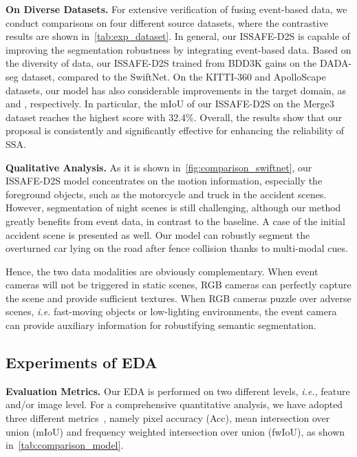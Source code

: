 \documentclass[letterpaper, 10 pt, conference]{ieeeconf}
\begin{document}
\textbf{On Diverse Datasets.}
For extensive verification of fusing event-based data, we conduct comparisons on four different source datasets, where the contrastive results are shown in~\cref{tab:exp_dataset}.
In general, our ISSAFE-D2S is capable of improving the segmentation robustness by integrating event-based data.
Based on the diversity of data, our ISSAFE-D2S trained from BDD3K gains  on the DADA-seg dataset, compared to the SwiftNet.
On the KITTI-360 and ApolloScape datasets, our model has also considerable improvements in the target domain, as  and , respectively.
In particular, the mIoU of our ISSAFE-D2S on the Merge3 dataset reaches the highest score with 32.4\%.
Overall, the results show that our proposal is consistently and significantly effective for enhancing the reliability of SSA.


\textbf{Qualitative Analysis.} As it is shown in~\cref{fig:comparison_swiftnet}, our ISSAFE-D2S model concentrates on the motion information, especially the foreground objects, such as the motorcycle and truck in the accident scenes. However, segmentation of night scenes is still challenging, although our method greatly benefits from event data, in contrast to the baseline. A case of the initial accident scene is presented as well. Our model can robustly segment the overturned car lying on the road after fence collision thanks to multi-modal cues.

Hence, the two data modalities are obviously complementary. When event cameras will not be triggered in static scenes, RGB cameras can perfectly capture the scene and provide sufficient textures. When RGB cameras puzzle over adverse scenes, \textit{i.e.} fast-moving objects or low-lighting environments, the event camera can provide auxiliary information for robustifying semantic segmentation. 

\subsection{Experiments of EDA}\label{Subsection4_2}
\textbf{Evaluation Metrics.} Our EDA is performed on two different levels, \textit{i.e.}, feature and/or image level. For a comprehensive quantitative analysis, we have adopted three different metrics~\cite{long2015FCN}, namely pixel accuracy (Acc), mean intersection over union (mIoU) and frequency weighted intersection over union (fwIoU), as shown in~\cref{tab:comparison_model}. 
\end{document}
